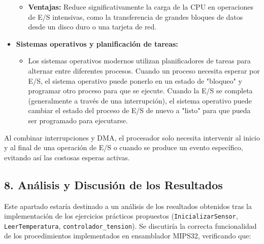 \documentclass[12pt]{article}
\begin{document}
\begin{itemize}
\begin{itemize}
        \item \textbf{Ventajas:} Reduce significativamente la carga de la CPU en operaciones de E/S intensivas, como la transferencia de grandes bloques de datos desde un disco duro o una tarjeta de red.
    \end{itemize}
    \item \textbf{Sistemas operativos y planificación de tareas:}
    \begin{itemize}
        \item Los sistemas operativos modernos utilizan planificadores de tareas para alternar entre diferentes procesos. Cuando un proceso necesita esperar por E/S, el sistema operativo puede ponerlo en un estado de "bloqueo" y programar otro proceso para que se ejecute. Cuando la E/S se completa (generalmente a través de una interrupción), el sistema operativo puede cambiar el estado del proceso de E/S de nuevo a "listo" para que pueda ser programado para ejecutarse.
    \end{itemize}
\end{itemize}
Al combinar interrupciones y DMA, el procesador solo necesita intervenir al inicio y al final de una operación de E/S o cuando se produce un evento específico, evitando así las costosas esperas activas.

\subsection*{8. Análisis y Discusión de los Resultados}

Este apartado estaría destinado a un análisis de los resultados obtenidos tras la implementación de los ejercicios prácticos propuestos (\texttt{InicializarSensor}, \texttt{LeerTemperatura}, \texttt{controlador\_tension}). Se discutiría la correcta funcionalidad de los procedimientos implementados en ensamblador MIPS32, verificando que:
\end{document}

